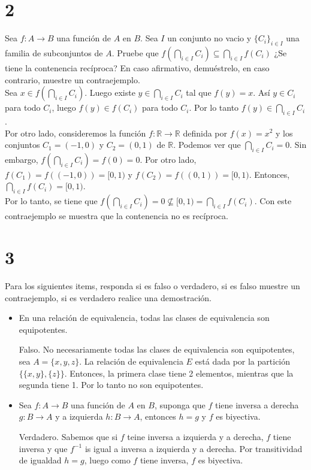 \documentclass{report}
\begin{document}
        \section*{2}Sea $f: A \rightarrow B$ una función de $A$ en $B$. Sea $I$ un conjunto no vacio y $\{C_i\}_{i \in I}$ una familia de subconjuntos de $A$. Pruebe que $f(\bigcap_{i \in I}{C_i}) \subseteq \bigcap_{i \in I}{f(C_i)}$ ¿Se tiene la contenencia recíproca? En caso afirmativo, demuéstrelo, en caso contrario, muestre un contraejemplo.\\

        Sea $x \in f(\bigcap_{i \in I}{C_i})$. Luego existe $y \in \bigcap_{i \in I}C_i$ tal que $f(y) = x$. Así $y \in C_i$ para todo $C_i$, luego $f(y) \in f(C_i)$ para todo $C_i$. Por lo tanto $f(y) \in \bigcap_{i \in I}C_i$.\\

        Por otro lado, consideremos la función $f: \mathbb{R} \to \mathbb{R}$ definida por $f(x) = x^2$ y los conjuntos $C_1 = (-1,0)$ y $C_2 = (0,1)$ de $\mathbb{R}$. Podemos ver que $\bigcap_{i \in I} C_i = {0}$. Sin embargo, $f(\bigcap_{i \in I} C_i) = f({0}) = {0}$. Por otro lado, $f(C_1) = f((-1,0)) = [0,1)$ y $f(C_2) = f((0,1)) = [0,1)$. Entonces, $\bigcap_{i \in I} f(C_i) = [0,1)$.\\

        Por lo tanto, se tiene que $f(\bigcap_{i \in I} C_i) = {0} \nsubseteq [0,1) = \bigcap_{i \in I} f(C_i)$. Con este contraejemplo se muestra que la contenencia no es recíproca.

        \section*{3}Para los siguientes items, responda si es falso o verdadero, si es falso muestre un contraejemplo, si es verdadero realice una demostración.
        \begin{itemize}
            \item En una relación de equivalencia, todas las clases de equivalencia son equipotentes.

                Falso. No necesariamente todas las clases de equivalencia son equipotentes, sea $A = \{x, y, z\}$. La relación de equivalencia $E$ está dada por la partición $\{\{x,y\},\{z\}\}$. Entonces, la primera clase tiene 2 elementos, mientras que la segunda tiene 1. Por lo tanto no son equipotentes.
            \item Sea $f: A \rightarrow B$ una función de $A$ en $B$, suponga que $f$ tiene inversa a derecha $g: B \rightarrow A$ y a izquierda $h: B \rightarrow A$, entonces $h=g$ y $f$ es biyectiva.

                Verdadero. Sabemos que si $f$ teine inversa a izquierda y a derecha, $f$ tiene inversa y que $f^{-1}$ is igual a inversa a izquierda y a derecha. Por transitividad de igualdad $h = g $, luego como $f$ tiene inversa, $f$ es biyectiva.
        \end{itemize}
\end{document}
